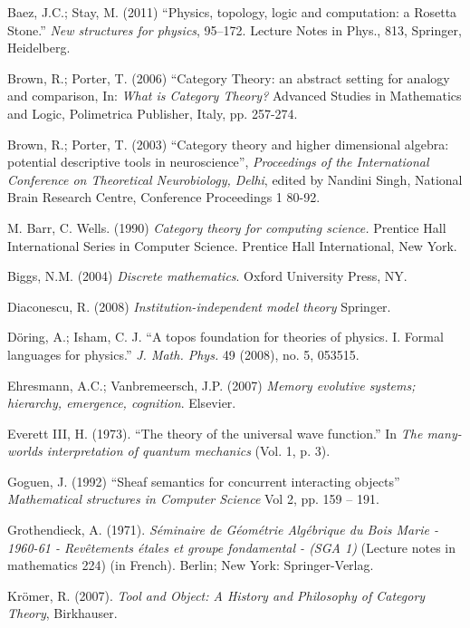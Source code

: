 \documentclass[a4paper]{book}
\theoremstyle{myth}
\begin{document}
\begin{russian}
\begin{thebibliography}{SGWB}
 Baez, J.C.; Stay, M. (2011) “Physics, topology, logic and computation: a Rosetta Stone.” {\em New structures for physics}, 95–172. Lecture Notes in Phys., 813, Springer, Heidelberg.

 Brown, R.; Porter, T. (2006) “Category Theory: an abstract setting for
analogy and comparison, In: {\em What is Category Theory?} Advanced
Studies in Mathematics and Logic, Polimetrica Publisher, Italy, pp. 257-274.

 Brown, R.; Porter, T. (2003) “Category theory and higher dimensional
algebra: potential descriptive tools in neuroscience”, {\em Proceedings
of the International Conference on Theoretical Neurobiology, Delhi}, edited by Nandini Singh, National Brain Research
Centre, Conference Proceedings 1 80-92. 

 M. Barr, C. Wells. (1990) {\em Category theory for computing science.} Prentice Hall International Series in Computer Science. Prentice Hall International, New York.

 Biggs, N.M. (2004) {\em Discrete mathematics}. Oxford University Press, NY. 

 Diaconescu, R. (2008) {\em Institution-independent model theory} Springer.

 D\"{o}ring, A.; Isham, C. J. “A topos foundation for theories of physics. I. Formal languages for physics.” 
{\em J. Math. Phys.} 49 (2008), no. 5, 053515.

 Ehresmann, A.C.; Vanbremeersch, J.P. (2007) {\em Memory evolutive systems; hierarchy, emergence, cognition}. Elsevier.

 Everett III, H. (1973). “The theory of the universal wave function.” In {\em The many-worlds interpretation of quantum mechanics} (Vol. 1, p. 3).

 Goguen, J. (1992) “Sheaf semantics for concurrent interacting objects” {\em Mathematical structures in Computer Science} Vol 2, pp. 159 -- 191.

 Grothendieck, A. (1971). {\em S\'eminaire de G\'eom\'etrie Alg\'ebrique du Bois Marie - 1960-61 - Rev\^etements \'etales et groupe fondamental - (SGA 1)} (Lecture notes in mathematics 224) (in French). Berlin; New York: Springer-Verlag.

 Kr\"{o}mer, R. (2007). {\em Tool and Object: A History and Philosophy of Category Theory}, Birkhauser.


\end{thebibliography}
\end{russian}
\end{document}

